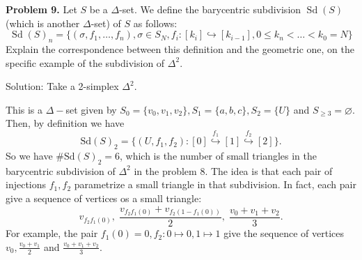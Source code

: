 \begin{dang}
\textbf{Problem 9.} Let \(S\) be a \(\Delta\)-set. We define the barycentric subdivision \(\operatorname{Sd}(S)\) (which is another \(\Delta\)-set) of \(S\) as follows:
    \[
    \operatorname{Sd}(S)_n = \{(\sigma ,f_1,\ldots ,f_n),\sigma \in 
    S_N,f_i:[k_i]\hookrightarrow [k_{i - 1}],0\leq k_n< \dots < k_0 = N\}
    \]
    Explain the correspondence between this definition and the geometric one, on the specific example of the subdivision of \(\Delta^2\).
\end{dang}
Solution: Take a 2-simplex $\Delta^2$.
\begin{center}
\end{center}
This is a $\Delta-$set given by $S_0=\{v_0,v_1,v_2\},S_1=\{a,b,c\},S_2=\{U\}$ and $S_{\geq3}=\varnothing$. Then, by definition 
we have 
\begin{equation}
    \text{Sd}(S)_2=\{(U,f_1,f_2): [0]\overset{f_1}{\hookrightarrow}[1]\overset{f_2}{\hookrightarrow}[2]\}.
\end{equation}
So we have $\#\text{Sd}(S)_2=6$, which is the number of small triangles in the barycentric subdivision of 
$\Delta^2$ in the problem 8. The idea is that each pair of injections $f_1,f_2$ parametrize 
a small triangle in that subdivision. In fact, each pair give a sequence of vertices os a small triangle:
\begin{equation}
    v_{f_2f_1(0)},\; \frac{v_{f_2f_1(0)}+v_{f_2(1-f_1(0))}}{2},\; \frac{v_0+v_1+v_2}{3}.
\end{equation}
For example, the pair $f_1(0)=0, f_2:0\mapsto 0, 1\mapsto 1$ give the sequence of vertices $v_0,\tfrac{v_0+v_1}{2}$ 
and $\tfrac{v_0+v_1+v_2}{3}$.\par 

